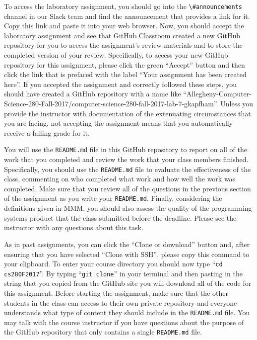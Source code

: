 \documentclass[11pt]{article}
\newcommand{\reflection}{\lstinline{README.md}}
\newcommand{\command}[1]{``\lstinline{#1}''}
\newcommand{\channel}[1]{\lstinline{#1}}
\begin{document}
To access the laboratory assignment, you should go into the \channel{\#announcements} channel in our Slack team and find
the announcement that provides a link for it. Copy this link and paste it into your web browser. Now, you should accept
the laboratory assignment and see that GitHub Classroom created a new GitHub repository for you to access the
assignment's review materials and to store the completed version of your review. Specifically, to access your new GitHub
repository for this assignment, please click the green ``Accept'' button and then click the link that is prefaced with
the label ``Your assignment has been created here''. If you accepted the assignment and correctly followed these steps,
you should have created a GitHub repository with a name like
``Allegheny-Computer-Science-280-Fall-2017/computer-science-280-fall-2017-lab-7-gkapfham''. Unless you provide the
instructor with documentation of the extenuating circumstances that you are facing, not accepting the assignment means
that you automatically receive a failing grade for it.

You will use the \reflection{} file in this GitHub repository to report on all of the work that you completed and review
the work that your class members finished. Specifically, you should use the \reflection{} file to evaluate the
effectiveness of the class, commenting on who completed what work and how well the work was completed. Make sure that
you review all of the questions in the previous section of the assignment as you write your \reflection{}. Finally,
considering the definitions given in MMM, you should also assess the quality of the programming systems product that the
class submitted before the deadline. Please see the instructor with any questions about this task.

As in past assignments, you can click the ``Clone or download'' button and, after ensuring that you have selected
``Clone with SSH'', please copy this command to your clipboard. To enter your course directory you should now type
\command{cd cs280F2017}. By typing \command{git clone} in your terminal and then pasting in the string that you copied
from the GitHub site you will download all of the code for this assignment. Before starting the assignment, make sure
that the other students in the class can access to their own private repository and everyone understands what type of
content they should include in the \reflection{} file. You may talk with the course instructor if you have questions
about the purpose of the GitHub repository that only contains a single \reflection{} file.
\end{document}
